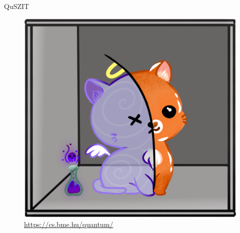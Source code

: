 \documentclass[aspectratio=169]{beamer}
\begin{document}
\begin{frame}{QuSZIT}
\begin{figure}
    \centering
    \includegraphics[width=0.4\linewidth]{./dipterv1_figures/schrodingers_purple.png}
    \vspace{0.3cm}
    \caption{\huge{\href{https://cs.bme.hu/quantum/}{https://cs.bme.hu/quantum/}}}
\end{figure}
\end{frame}
\end{document}
